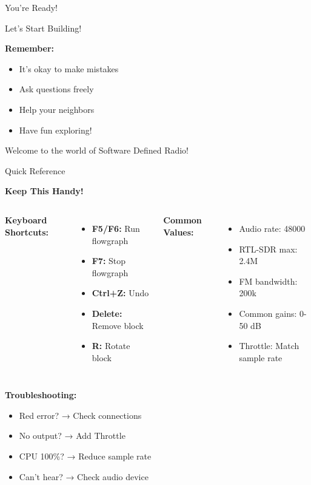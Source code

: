 \documentclass[aspectratio=169,11pt]{beamer}
\newcommand{\highlight}[1]{\colorbox{yellow!30}{#1}}
\begin{document}

\begin{frame}{You're Ready!}
\begin{center}
\Huge\textcolor{radioblue}{Let's Start Building!}
\end{center}
\vspace{1em}
\begin{center}
\Large
\textbf{Remember:}
\begin{itemize}
    \item It's okay to make mistakes
    \item Ask questions freely
    \item Help your neighbors
    \item Have fun exploring!
\end{itemize}
\end{center}
\vspace{1em}
\begin{center}
\Large\highlight{Welcome to the world of Software Defined Radio!}
\end{center}
\end{frame}

\begin{frame}{Quick Reference}
\begin{center}
\Large\textbf{Keep This Handy!}
\end{center}
\vspace{0.5em}
\begin{columns}
\textbf{Keyboard Shortcuts:}
\begin{itemize}
    \item \textbf{F5/F6:} Run flowgraph
    \item \textbf{F7:} Stop flowgraph
    \item \textbf{Ctrl+Z:} Undo
    \item \textbf{Delete:} Remove block
    \item \textbf{R:} Rotate block
\end{itemize}

\textbf{Common Values:}
\begin{itemize}
    \item Audio rate: 48000
    \item RTL-SDR max: 2.4M
    \item FM bandwidth: 200k
    \item Common gains: 0-50 dB
    \item Throttle: Match sample rate
\end{itemize}
\end{columns}
\vspace{0.5em}
\textbf{Troubleshooting:}
\begin{itemize}
    \item Red error? → Check connections
    \item No output? → Add Throttle
    \item CPU 100\%? → Reduce sample rate
    \item Can't hear? → Check audio device
\end{itemize}
\end{frame}
\end{document}
